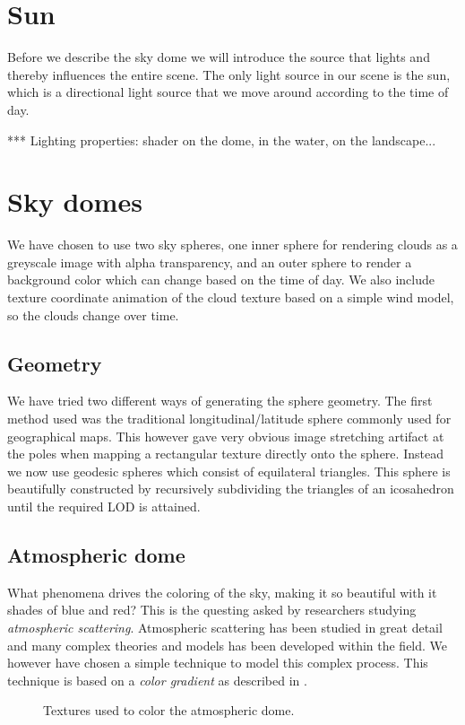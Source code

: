 \section{Sun}
Before we describe the sky dome we will introduce the source that
lights and thereby influences the entire scene. The only light source
in our scene is the sun, which is a directional light source that we
move around according to the time of day.

*** Lighting properties: shader on the dome, in the water, on the landscape...

\section{Sky domes}
We have chosen to use two sky spheres, one inner sphere for rendering
clouds as a greyscale image with alpha transparency, and an outer
sphere to render a background color which can change based on the time
of day. We also include texture coordinate animation of the cloud
texture based on a simple wind model, so the clouds change over time.

\subsection{Geometry}
We have tried two different ways of generating the sphere
geometry. The first method used was the traditional
longitudinal/latitude sphere commonly used for geographical maps. This
however gave very obvious image stretching artifact at the poles when
mapping a rectangular texture directly onto the sphere. Instead we now
use geodesic spheres which consist of equilateral triangles. This
sphere is beautifully constructed by recursively subdividing the
triangles of an icosahedron until the required LOD is attained.

\subsection{Atmospheric dome}
What phenomena drives the coloring of the sky, making it so beautiful
with it shades of blue and red?
This is the questing asked by researchers studying 
\emph{atmospheric scattering}. Atmospheric scattering has been studied
in great detail and many complex theories and models has been
developed within the field. We however have chosen a simple technique
to model this complex process. This technique is based on a
\emph{color gradient} as described in .

\begin{figure}[!h]
  \centering
  \hspace{8mm}
  \caption{Textures used to color the atmospheric dome.}
  \label{fig:atmosphere}
\end{figure}

